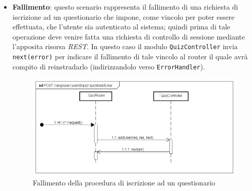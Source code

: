 \begin{itemize}
\item \textbf{Fallimento}: questo scenario rappresenta il fallimento di una richiesta di iscrizione ad un questionario che impone, come vincolo per poter essere effettuata, che l'utente sia autenticato al sistema; quindi prima di tale operazione deve venire fatta una richiesta di controllo di sessione mediante l'apposita risorsa \textit{REST}. In questo caso il modulo \texttt{QuizController} invia \texttt{next(error)} per indicare il fallimento di tale vincolo al router il quale avrà compito di reinstradarlo (indirizzandolo verso \texttt{ErrorHandler}).
\label{Fallimento della procedura di iscrizione ad un questionario}
\begin{figure}[ht]
	\centering
	\includegraphics[scale=0.50]{UML/DiagrammiDiSequenza/Back-end/POST__lang_user_userId_quiz_quizId_addUser_failure.png}
	\caption{Fallimento della procedura di iscrizione ad un questionario}
\end{figure}
\FloatBarrier
\end{itemize}

